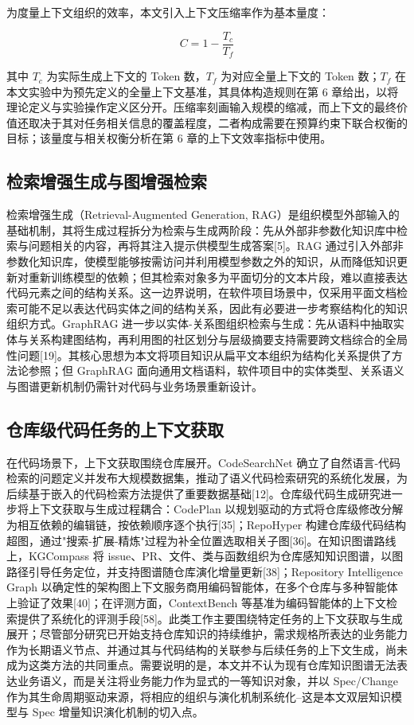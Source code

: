 为度量上下文组织的效率，本文引入上下文压缩率作为基本量度：

\begin{equation}
C = 1 - \frac{T_c}{T_f} \tag{2-2}
\end{equation}

其中 $T_c$ 为实际生成上下文的 Token 数，$T_f$ 为对应全量上下文的 Token 数；$T_f$ 在本文实验中为预先定义的全量上下文基准，其具体构造规则在第 6 章给出，以将理论定义与实验操作定义区分开。压缩率刻画输入规模的缩减，而上下文的最终价值还取决于其对任务相关信息的覆盖程度，二者构成需要在预算约束下联合权衡的目标；该量度与相关权衡分析在第 6 章的上下文效率指标中使用。


\subsection{检索增强生成与图增强检索}
检索增强生成（Retrieval-Augmented Generation, RAG）是组织模型外部输入的基础机制，其将生成过程拆分为检索与生成两阶段：先从外部非参数化知识库中检索与问题相关的内容，再将其注入提示供模型生成答案[5]。RAG 通过引入外部非参数化知识库，使模型能够按需访问并利用模型参数之外的知识，从而降低知识更新对重新训练模型的依赖；但其检索对象多为平面切分的文本片段，难以直接表达代码元素之间的结构关系。这一边界说明，在软件项目场景中，仅采用平面文档检索可能不足以表达代码实体之间的结构关系，因此有必要进一步考察结构化的知识组织方式。GraphRAG 进一步以实体-关系图组织检索与生成：先从语料中抽取实体与关系构建图结构，再利用图的社区划分与层级摘要支持需要跨文档综合的全局性问题[19]。其核心思想为本文将项目知识从扁平文本组织为结构化关系提供了方法论参照；但 GraphRAG 面向通用文档语料，软件项目中的实体类型、关系语义与图谱更新机制仍需针对代码与业务场景重新设计。


\subsection{仓库级代码任务的上下文获取}
在代码场景下，上下文获取围绕仓库展开。CodeSearchNet 确立了自然语言-代码检索的问题定义并发布大规模数据集，推动了语义代码检索研究的系统化发展，为后续基于嵌入的代码检索方法提供了重要数据基础[12]。仓库级代码生成研究进一步将上下文获取与生成过程耦合：CodePlan 以规划驱动的方式将仓库级修改分解为相互依赖的编辑链，按依赖顺序逐个执行[35]；RepoHyper 构建仓库级代码结构超图，通过"搜索-扩展-精炼"过程为补全位置选取相关子图[36]。在知识图谱路线上，KGCompass 将 issue、PR、文件、类与函数组织为仓库感知知识图谱，以图路径引导任务定位，并支持图谱随仓库演化增量更新[38]；Repository Intelligence Graph 以确定性的架构图上下文服务商用编码智能体，在多个仓库与多种智能体上验证了效果[40]；在评测方面，ContextBench 等基准为编码智能体的上下文检索提供了系统化的评测手段[58]。此类工作主要围绕特定任务的上下文获取与生成展开；尽管部分研究已开始支持仓库知识的持续维护，需求规格所表达的业务能力作为长期语义节点、并通过其与代码结构的关联参与后续任务的上下文生成，尚未成为这类方法的共同重点。需要说明的是，本文并不认为现有仓库知识图谱无法表达业务语义，而是关注将业务能力作为显式的一等知识对象，并以 Spec/Change 作为其生命周期驱动来源，将相应的组织与演化机制系统化--这是本文双层知识模型与 Spec 增量知识演化机制的切入点。


